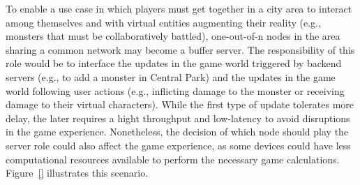 To enable a use case in which players must get together in a city area to interact among themselves and with virtual entities augmenting their reality (e.g., monsters that must be collaboratively battled), one-out-of-n nodes in the area sharing a common network may become a buffer server. The responsibility of this role would be to interface the updates in the game world triggered by backend servers (e.g., to add a monster in Central Park) and the updates in the game world following user actions (e.g., inflicting damage to the monster or receiving damage to their virtual characters). While the first type of update tolerates more delay, the later requires a hight throughput and low-latency to avoid disruptions in the game experience. Nonetheless, the decision of which node should play the server role could also affect the game experience, as some devices could have less computational resources available to perform the necessary game calculations. Figure~\ref{} illustrates this scenario.



